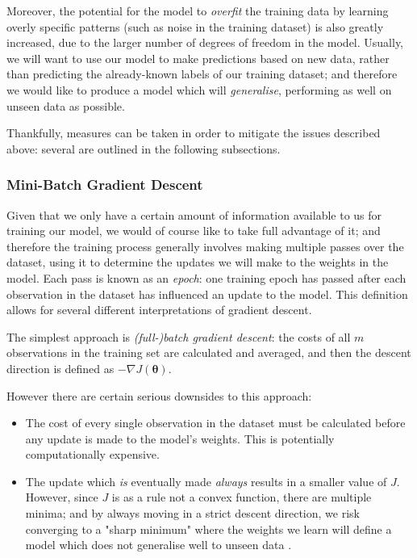 \documentclass{article}[11pt]
\begin{document}
        Moreover, the potential for the model to \textit{overfit} the training data by learning overly specific patterns (such as noise in the training dataset) is also greatly increased, due to the larger number of degrees of freedom in the model. Usually, we will want to use our model to make predictions based on new data, rather than predicting the already-known labels of our training dataset; and therefore we would like to produce a model which will \textit{generalise}, performing as well on unseen data as possible.
        
        Thankfully, measures can be taken in order to mitigate the issues described above: several are outlined in the following subsections.
        
        
        
        \subsubsection{Mini-Batch Gradient Descent}
            
            Given that we only have a certain amount of information available to us for training our model, we would of course like to take full advantage of it; and therefore the training process generally involves making multiple passes over the dataset, using it to determine the updates we will make to the weights in the model. Each pass is known as an \textit{epoch}: one training epoch has passed after each observation in the dataset has influenced an update to the model. This definition allows for several different interpretations of gradient descent.
            
            The simplest approach is \textit{(full-)batch gradient descent}: the costs of all $m$ observations in the training set are calculated and averaged, and then the descent direction is defined as $- \nabla J(\boldsymbol{\theta})$.
            
            However there are certain serious downsides to this approach:
            
            \begin{itemize}
                
                \item The cost of every single observation in the dataset must be calculated before any update is made to the model's weights. This is potentially computationally expensive.
                
                \item The update which \textit{is} eventually made \textit{always} results in a smaller value of $J$. However, since $J$ is as a rule not a convex function, there are multiple minima; and by always moving in a strict descent direction, we risk converging to a "sharp minimum" where the weights we learn will define a model which does not generalise well to unseen data \cite{large_batch}.
                
            \end{itemize}
            
\end{document}
